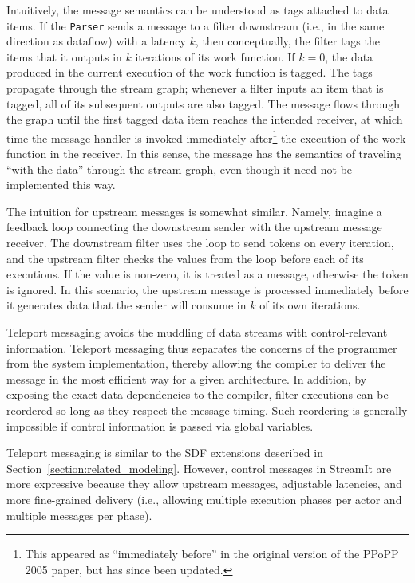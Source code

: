 Intuitively, the message semantics can be understood as tags
attached to data items.  If the {\tt Parser} sends a message to
a filter downstream (i.e., in the same direction as dataflow) with a
latency $k$, then conceptually, the filter tags the items that it
outputs in $k$ iterations of its work function. If $k=0$, the data
produced in the current execution of the work function is tagged. The
tags propagate through the stream graph; whenever a filter inputs an
item that is tagged, all of its subsequent outputs are also
tagged. The message flows through the graph until the first tagged data
item reaches the intended receiver, at which time the message handler is
invoked immediately 
after\footnote{This appeared as ``immediately before'' in the 
original version of the PPoPP
2005 paper, but has since been updated.} the execution of the work function in the
receiver.  In this sense, the message has the semantics of traveling
``with the data'' through the stream graph, even though it 
need not be implemented this way.

The intuition for upstream messages is somewhat similar. Namely,
imagine a feedback loop connecting the downstream sender with the
upstream message receiver. The downstream filter uses the loop to send
tokens on every iteration, and the upstream filter checks the values
from the loop before each of its executions. If the value is non-zero,
it is treated as a message, otherwise the token is ignored. In this
scenario, the upstream message is processed immediately before it
generates data that the sender will consume in $k$ of its own
iterations.

Teleport messaging avoids the muddling of data streams with
control-relevant information. Teleport messaging thus separates the
concerns of the programmer from the system implementation,
thereby allowing the compiler to deliver the message in the most
efficient way for a given architecture. In addition, by exposing the
exact data dependencies to the compiler, filter executions can be
reordered so long as they respect the message timing.  Such reordering
is generally impossible if control information is passed via global
variables.

Teleport messaging is similar to the SDF extensions described
in Section~\ref{section:related_modeling}. However, control messages in StreamIt are more
expressive because they allow upstream messages,
adjustable latencies, and more fine-grained delivery (i.e., allowing multiple execution
phases per actor and multiple messages per phase).

